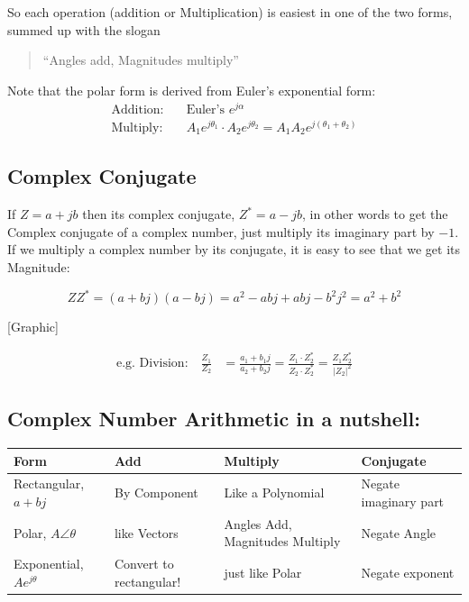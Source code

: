 So each operation (addition or Multiplication) is easiest in one of the two forms, summed up with the slogan
\begin{quotation}``Angles add, Magnitudes multiply''\end{quotation}

Note that the polar form is derived from Euler's exponential form:
\begin{align}
\text{Addition:} \quad &\text{Euler's $e^{j\alpha}$} \\
\text{Multiply:} \quad &A_1e^{j\theta_1} \cdot A_2e^{j\theta_2} = A_1A_2e^{j(\theta_1+\theta_2)}
\end{align}



\subsection{Complex Conjugate}
If $Z = a + jb$ then its complex conjugate, $Z^* = a - jb $, in other words to get the Complex conjugate of  a complex
number, just multiply its imaginary part by $-1$.
If we multiply a complex number by its conjugate, it is easy to see that we get its Magnitude:

\[
ZZ^* =  (a+bj)(a-bj) = a^2 - abj + abj - b^2j^2 = a^2 + b^2
\]

[Graphic]


\begin{align}
\text{e.g. Division:} \quad \frac{Z_1}{Z_2} &= \frac{a_1 + b_1j}{a_2 + b_2j} = \frac{Z_1 \cdot Z_2^*}{Z_2 \cdot Z_2^*} = \frac{Z_1Z_2^*}{|Z_2|^2}
\end{align}

\subsection*{Complex Number Arithmetic in a nutshell:}
\begin{tabular}{l|p{}|p{1.0in}|p{1.0in}}
Form                 & Add           & Multiply           & Conjugate \\\hline
Rectangular, $a+bj$  & By Component  & Like a Polynomial  & Negate imaginary part\\ \hline
Polar,
$A\angle{\theta}$    & like Vectors  & Angles Add, Magnitudes Multiply & Negate Angle \\ \hline
Exponential,
$Ae^{j\theta}$       & Convert to rectangular! & just like Polar & Negate exponent
\end{tabular}

